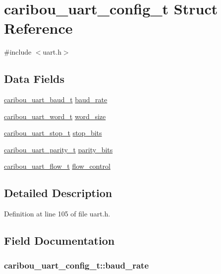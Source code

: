 \hypertarget{structcaribou__uart__config__t}{\section{caribou\-\_\-uart\-\_\-config\-\_\-t Struct Reference}
\label{structcaribou__uart__config__t}
}


{\ttfamily \#include $<$uart.\-h$>$}

\subsection*{Data Fields}
\begin{DoxyCompactItemize}
\item 
\hyperlink{uart_8h_afef1566c0e2499ac54d03f9840e67367}{caribou\-\_\-uart\-\_\-baud\-\_\-t} \hyperlink{structcaribou__uart__config__t_a6138aeea535f2b07ffe791cf77805e78}{baud\-\_\-rate}
\item 
\hyperlink{uart_8h_a9a6df27e70711dcf554553bcd934cdf9}{caribou\-\_\-uart\-\_\-word\-\_\-t} \hyperlink{structcaribou__uart__config__t_a89d25d0eefe1f3856ccc6568026e00b1}{word\-\_\-size}
\item 
\hyperlink{uart_8h_a8a7a8a9e91ed00784943f12dd2b3825e}{caribou\-\_\-uart\-\_\-stop\-\_\-t} \hyperlink{structcaribou__uart__config__t_a9489f3e6667476da945ac8b99543e9c0}{stop\-\_\-bits}
\item 
\hyperlink{uart_8h_a21331436e5b880d78970abb6dbfad09b}{caribou\-\_\-uart\-\_\-parity\-\_\-t} \hyperlink{structcaribou__uart__config__t_aeb5a0f9cc2e23070859bcb7033777e14}{parity\-\_\-bits}
\item 
\hyperlink{uart_8h_a54948edc934015197b158136f30a074d}{caribou\-\_\-uart\-\_\-flow\-\_\-t} \hyperlink{structcaribou__uart__config__t_a94d7122367d7664b02df609cbae278c2}{flow\-\_\-control}
\end{DoxyCompactItemize}


\subsection{Detailed Description}


Definition at line 105 of file uart.\-h.



\subsection{Field Documentation}
\hypertarget{structcaribou__uart__config__t_a6138aeea535f2b07ffe791cf77805e78}{
\subsubsection[{baud\-\_\-rate}]{ caribou\-\_\-uart\-\_\-config\-\_\-t\-::baud\-\_\-rate}}\label{structcaribou__uart__config__t_a6138aeea535f2b07ffe791cf77805e78}


